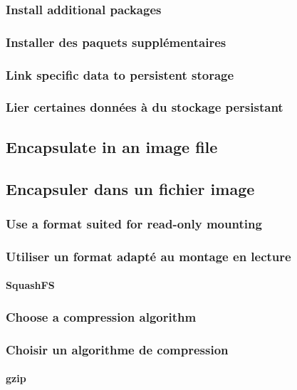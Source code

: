 \ml
{\subsubsection{Install additional packages}}
{\subsubsection{Installer des paquets supplémentaires}}

\ml
{\subsubsection{Link specific data to persistent storage}}
{\subsubsection{Lier certaines données à du stockage persistant}}

\ml
{\subsection{Encapsulate in an image file}}
{\subsection{Encapsuler dans un fichier image}}

\ml
{\subsubsection{Use a format suited for read-only mounting}}
{\subsubsection{Utiliser un format adapté au montage en lecture}}

\paragraph{SquashFS}

\ml
{\subsubsection{Choose a compression algorithm}}
{\subsubsection{Choisir un algorithme de compression}}

\paragraph{gzip}

